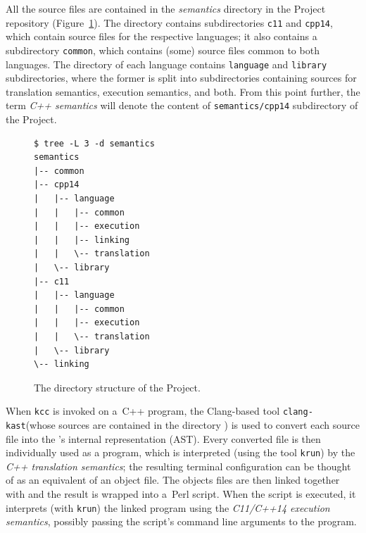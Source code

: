\documentclass[nolot,nolof,nocover,printed]{fithesis3}
\newcommand{\krun}{\texttt{krun}\xspace}
\newcommand{\clangKast}{\texttt{clang-kast}\xspace}
\newcommand{\kcc}{\texttt{kcc}\xspace}
\newcommand{\Project}{Project\xspace}
\begin{document}
All the \K source files are contained in the \textit{semantics} directory in the Project repository (Figure~\ref{fig:directoryStructure}). The directory contains subdirectories \texttt{c11} and \texttt{cpp14}, which contain source files for the respective languages; it also contains a subdirectory \texttt{common}, which contains (some) source files common to both languages. The directory of each language contains \texttt{language} and \texttt{library} subdirectories, where the former is split into subdirectories containing sources for translation semantics, execution semantics, and both. From this point further, the term \textit{C++ semantics} will denote the content of \texttt{semantics/cpp14} subdirectory of the Project.

\begin{figure}[ht]
\begin{lstlisting}
$ tree -L 3 -d semantics
semantics
|-- common
|-- cpp14
|   |-- language
|   |   |-- common
|   |   |-- execution
|   |   |-- linking
|   |   \-- translation
|   \-- library
|-- c11
|   |-- language
|   |   |-- common
|   |   |-- execution
|   |   \-- translation
|   \-- library
\-- linking
\end{lstlisting}
\caption{The directory structure of the \Project.}
\label{fig:directoryStructure}
\end{figure}

When \kcc is invoked on a~C++ program, the Clang-based tool \clangKast (whose sources are contained in the directory ) is used to convert each source file into the \K's internal representation (\K AST). Every converted file is then individually used as a program, which is interpreted (using the \K tool \krun) by the \textit{C++ translation semantics}; the resulting terminal configuration can be thought of as an equivalent of an object file. The objects files are then linked together with and the result is wrapped into a~Perl script. When the script is executed, it interprets (with \krun) the linked program using the \textit{C11/C++14 execution semantics}, possibly passing the script's command line arguments to the program.

\end{document}
